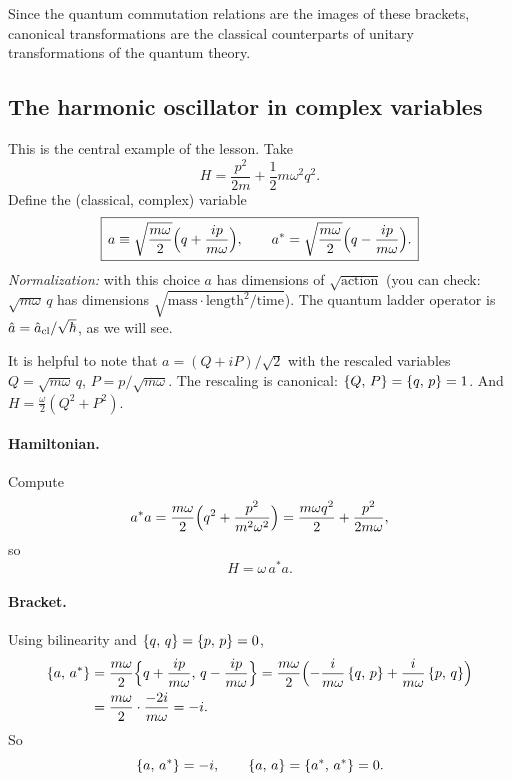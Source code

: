 \documentclass[11pt]{article}
\begin{document}
Since the quantum commutation relations are the images of these brackets, canonical transformations are the classical counterparts of unitary transformations of the quantum theory.

\subsection{The harmonic oscillator in complex variables}
\label{sec:ladder}

This is the central example of the lesson. Take
\begin{equation}
 H=\frac{p^2}{2m}+\frac12m\omega^2q^2 .
\end{equation}
Define the (classical, complex) variable
\begin{equation}
 \boxed{\,a\equiv\sqrt{\frac{m\omega}2}\Bigl(q+\frac{ip}{m\omega}\Bigr),\qquad a^*=\sqrt{\frac{m\omega}2}\Bigl(q-\frac{ip}{m\omega}\Bigr).\,}
\label{eq:adef}
\end{equation}
\emph{Normalization:} with this choice $a$ has dimensions of $\sqrt{\text{action}}$ (you can check: $\sqrt{m\omega}\,q$ has dimensions $\sqrt{\text{mass}\cdot\text{length}^2/\text{time}}$). The quantum ladder operator is $\hat a=\hat a_{\rm cl}/\sqrt\hbar$, as we will see.

It is helpful to note that $a=(Q+iP)/\sqrt2$ with the rescaled variables $Q=\sqrt{m\omega}\,q$, $P=p/\sqrt{m\omega}$. The rescaling is canonical: $\left\{Q,\,P\right\}=\left\{q,\,p\right\}=1$. And $H=\tfrac\omega2(Q^2+P^2)$.

\paragraph{Hamiltonian.} Compute
\begin{equation}
 a^*a=\frac{m\omega}2\Bigl(q^2+\frac{p^2}{m^2\omega^2}\Bigr)=\frac{m\omega q^2}2+\frac{p^2}{2m\omega},
\end{equation}
so
\begin{equation}
 H=\omega\,a^*a .
\end{equation}

\paragraph{Bracket.} Using bilinearity and $\left\{q,\,q\right\}=\left\{p,\,p\right\}=0$,
\begin{align}
 \left\{a,\,a^*\right\}&=\frac{m\omega}2\Bigl\{q+\frac{ip}{m\omega},\,q-\frac{ip}{m\omega}\Bigr\}
 =\frac{m\omega}2\Bigl(-\frac i{m\omega}\left\{q,\,p\right\}+\frac i{m\omega}\left\{p,\,q\right\}\Bigr)\nonumber\\
 &=\frac{m\omega}{2}\cdot\frac{-2i}{m\omega}=-i .
\end{align}
So
\begin{equation}
 \left\{a,\,a^*\right\}=-i,\qquad \left\{a,\,a\right\}=\left\{a^*,\,a^*\right\}=0 .
\end{equation}
\end{document}
